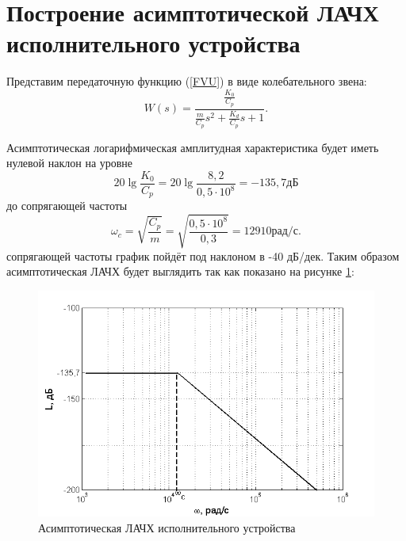\documentclass[12pt,a4paper]{article}
\begin{document}
\newpage
\section{Построение асимптотической ЛАЧХ исполнительного устройства}
Представим передаточную функцию (\ref{FVU}) в виде колебательного звена:
\begin{equation} 
    W(s) = \frac{\displaystyle{\frac{K_0}{C_p}}}{\displaystyle{\frac{m}{C_p}}s^2 + \frac{K_d}{C_p}s + 1}.
\end{equation}

Асимптотическая логарифмическая амплитудная характеристика будет иметь нулевой наклон на уровне 
\begin{equation} 
   20\lg\displaystyle{\frac{K_0}{C_p}} = 20\lg \displaystyle{\frac{8,2}{0,5\cdot10^8}} = -135,7 \text{дБ}
\end{equation}
до сопрягающей частоты 
\begin{equation} 
	\omega_c = \sqrt{\displaystyle{\frac{C_p}{m}}} = \sqrt{\displaystyle{\frac{0,5\cdot10^8}{0,3}}} = 12910 \text{рад/с}.
\end{equation}
 сопрягающей частоты график пойдёт под наклоном в -40 дБ/дек. Таким образом асимптотическая ЛАЧХ будет выглядить так как показано на рисунке \ref{L}:
\begin{figure}[H]
	\centering
	\includegraphics[width = \textwidth]{L}
	\caption{Асимптотическая ЛАЧХ исполнительного устройства}
	\label{L}
\end{figure}

\newpage
\end{document}
